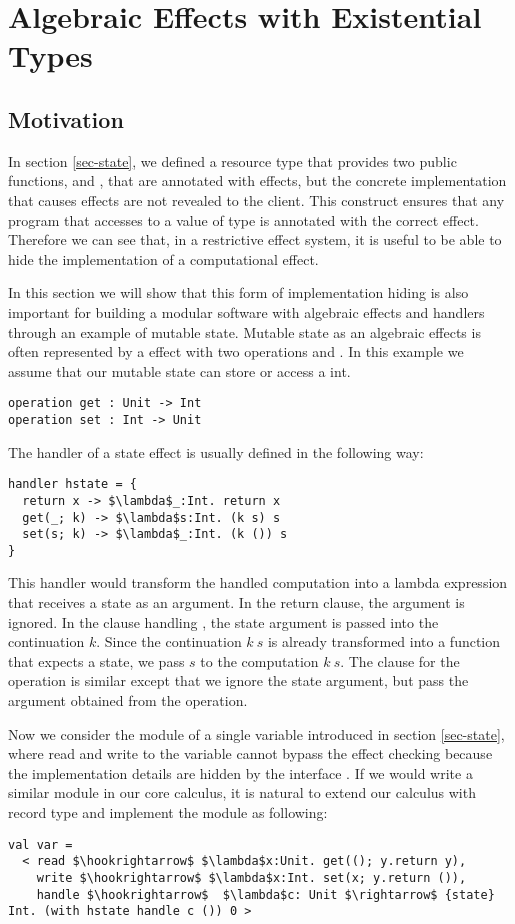 
\chapter{Algebraic Effects with Existential Types}
\section{Motivation}
In section \ref{sec-state}, we defined a resource type  that provides two public functions,  and , that are annotated with effects, but the concrete implementation that causes effects are not revealed to the client. This construct ensures that any program that accesses to a value of type  is annotated with the correct effect. Therefore we can see that, in a restrictive effect system, it is useful to be able to hide the implementation of a computational effect.  

In this section we will show that this form of implementation hiding is also important for building a modular software with algebraic effects and handlers through an example of mutable state. Mutable state as an algebraic effects is often represented by a  effect with two operations  and . In this example we assume that our mutable state can store or access a int.
\begin{lstlisting}
operation get : Unit -> Int
operation set : Int -> Unit
\end{lstlisting}

The handler of a state effect is usually defined in the following way:
\begin{lstlisting}[mathescape=true]
handler hstate = {
  return x -> $\lambda$_:Int. return x
  get(_; k) -> $\lambda$s:Int. (k s) s
  set(s; k) -> $\lambda$_:Int. (k ()) s
}
\end{lstlisting}
This handler would transform the handled computation into a lambda expression that receives a state as an argument. In the return clause, the argument is ignored. In the clause handling ,  the state argument is passed into the continuation $k$. Since the continuation $k\ s$ is already transformed into a function that expects a state, we pass $s$ to the computation $k\ s$. The clause for the  operation is similar except that we ignore the state argument, but pass the argument obtained from the  operation. 

Now we consider the module of a single variable introduced in section \ref{sec-state}, where read and write to the variable cannot bypass the effect checking because the implementation details are hidden by the interface . If we would write a similar module in our core calculus, it is natural to extend our calculus with record type and implement the module as following:
\begin{lstlisting}[mathescape=true]
val var = 
  < read $\hookrightarrow$ $\lambda$x:Unit. get((); y.return y),
    write $\hookrightarrow$ $\lambda$x:Int. set(x; y.return ()),
    handle $\hookrightarrow$  $\lambda$c: Unit $\rightarrow$ {state} Int. (with hstate handle c ()) 0 >
\end{lstlisting}

